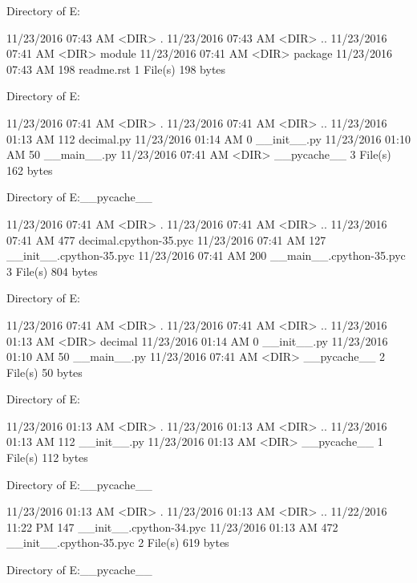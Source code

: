  Directory of E:\Python\apeman\examples

11/23/2016  07:43 AM    <DIR>          .
11/23/2016  07:43 AM    <DIR>          ..
11/23/2016  07:41 AM    <DIR>          module
11/23/2016  07:41 AM    <DIR>          package
11/23/2016  07:43 AM               198 readme.rst
               1 File(s)            198 bytes

 Directory of E:\Python\apeman\examples\module

11/23/2016  07:41 AM    <DIR>          .
11/23/2016  07:41 AM    <DIR>          ..
11/23/2016  01:13 AM               112 decimal.py
11/23/2016  01:14 AM                 0 __init__.py
11/23/2016  01:10 AM                50 __main__.py
11/23/2016  07:41 AM    <DIR>          __pycache__
               3 File(s)            162 bytes

 Directory of E:\Python\apeman\examples\module\__pycache__

11/23/2016  07:41 AM    <DIR>          .
11/23/2016  07:41 AM    <DIR>          ..
11/23/2016  07:41 AM               477 decimal.cpython-35.pyc
11/23/2016  07:41 AM               127 __init__.cpython-35.pyc
11/23/2016  07:41 AM               200 __main__.cpython-35.pyc
               3 File(s)            804 bytes

 Directory of E:\Python\apeman\examples\package

11/23/2016  07:41 AM    <DIR>          .
11/23/2016  07:41 AM    <DIR>          ..
11/23/2016  01:13 AM    <DIR>          decimal
11/23/2016  01:14 AM                 0 __init__.py
11/23/2016  01:10 AM                50 __main__.py
11/23/2016  07:41 AM    <DIR>          __pycache__
               2 File(s)             50 bytes

 Directory of E:\Python\apeman\examples\package\decimal

11/23/2016  01:13 AM    <DIR>          .
11/23/2016  01:13 AM    <DIR>          ..
11/23/2016  01:13 AM               112 __init__.py
11/23/2016  01:13 AM    <DIR>          __pycache__
               1 File(s)            112 bytes

 Directory of E:\Python\apeman\examples\package\decimal\__pycache__

11/23/2016  01:13 AM    <DIR>          .
11/23/2016  01:13 AM    <DIR>          ..
11/22/2016  11:22 PM               147 __init__.cpython-34.pyc
11/23/2016  01:13 AM               472 __init__.cpython-35.pyc
               2 File(s)            619 bytes

 Directory of E:\Python\apeman\examples\package\__pycache__

